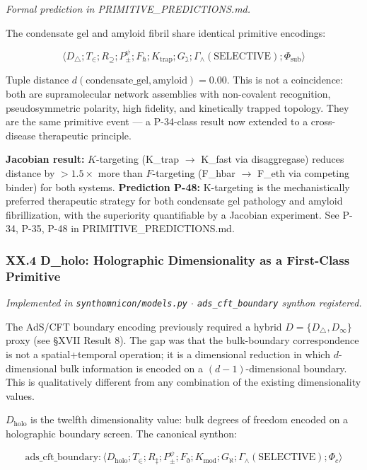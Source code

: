 \documentclass[12pt,a4paper]{article}
\begin{document}
\emph{Formal prediction in PRIMITIVE\_PREDICTIONS.md.}

The condensate gel and amyloid fibril share identical primitive encodings:


\[\langle D_{\bigtriangleup}; T_{\in}; R_{\supseteq}; P_{\pm}^{\psi}; F_{\hbar}; K_{\text{trap}}; G_{\gimel}; \Gamma_{\wedge}(\text{SELECTIVE}); \Phi_{\text{sub}} \rangle\]

Tuple distance $d(\text{condensate\_gel}, \text{amyloid}) = 0.00$. This is not a coincidence: both are supramolecular network assemblies with non-covalent recognition, pseudosymmetric polarity, high fidelity, and kinetically trapped topology. They are the same primitive event --- a P-34-class result now extended to a cross-disease therapeutic principle.

\textbf{Jacobian result:} $K$-targeting (K\_trap $\rightarrow$ K\_fast via disaggregase) reduces distance by $>1.5\times$ more than $F$-targeting (F\_hbar $\rightarrow$ F\_eth via competing binder) for both systems. \textbf{Prediction P-48:} K-targeting is the mechanistically preferred therapeutic strategy for both condensate gel pathology and amyloid fibrillization, with the superiority quantifiable by a Jacobian experiment. See P-34, P-35, P-48 in PRIMITIVE\_PREDICTIONS.md.

\subsubsection{XX.4 D\_holo: Holographic Dimensionality as a First-Class Primitive}

\emph{Implemented in \texttt{synthomnicon/models.py} $\cdot$ \texttt{ads\_cft\_boundary} synthon registered.}

The AdS/CFT boundary encoding previously required a hybrid $D = \{D_{\bigtriangleup}, D_{\infty}\}$ proxy (see §XVII Result 8). The gap was that the bulk-boundary correspondence is not a spatial+temporal operation; it is a dimensional reduction in which $d$-dimensional bulk information is encoded on a $(d-1)$-dimensional boundary. This is qualitatively different from any combination of the existing dimensionality values.

$D_{\text{holo}}$ is the twelfth dimensionality value: bulk degrees of freedom encoded on a holographic boundary screen. The canonical synthon:

\[\text{ads\_cft\_boundary}: \langle D_{\text{holo}}; T_{\in}; R_{\ddagger}; P_{\pm}^{\psi}; F_{\eth}; K_{\text{mod}}; G_{\aleph}; \Gamma_{\wedge}(\text{SELECTIVE}); \Phi_c \rangle\]
\end{document}
